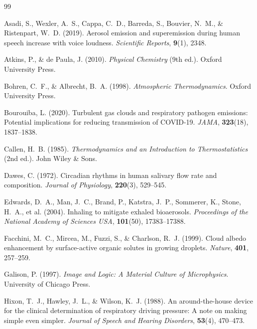\documentclass[11pt,a4paper]{article}
\theoremstyle{definition}
\theoremstyle{plain}
\begin{document}
\begin{thebibliography}{99}
\small

Asadi, S., Wexler, A.~S., Cappa, C.~D., Barreda, S., Bouvier, N.~M., \& Ristenpart, W.~D. (2019).
Aerosol emission and superemission during human speech increase with voice loudness.
\textit{Scientific Reports}, \textbf{9}(1), 2348.

Atkins, P., \& de Paula, J. (2010).
\textit{Physical Chemistry} (9th ed.).
Oxford University Press.

Bohren, C.~F., \& Albrecht, B.~A. (1998).
\textit{Atmospheric Thermodynamics}.
Oxford University Press.

Bourouiba, L. (2020).
Turbulent gas clouds and respiratory pathogen emissions: Potential implications for reducing transmission of COVID-19.
\textit{JAMA}, \textbf{323}(18), 1837--1838.

Callen, H.~B. (1985).
\textit{Thermodynamics and an Introduction to Thermostatistics} (2nd ed.).
John Wiley \& Sons.

Dawes, C. (1972).
Circadian rhythms in human salivary flow rate and composition.
\textit{Journal of Physiology}, \textbf{220}(3), 529--545.

Edwards, D.~A., Man, J.~C., Brand, P., Katstra, J.~P., Sommerer, K., Stone, H.~A., et al. (2004).
Inhaling to mitigate exhaled bioaerosols.
\textit{Proceedings of the National Academy of Sciences USA}, \textbf{101}(50), 17383--17388.

Facchini, M.~C., Mircea, M., Fuzzi, S., \& Charlson, R.~J. (1999).
Cloud albedo enhancement by surface-active organic solutes in growing droplets.
\textit{Nature}, \textbf{401}, 257--259.

Galison, P. (1997).
\textit{Image and Logic: A Material Culture of Microphysics}.
University of Chicago Press.

Hixon, T.~J., Hawley, J.~L., \& Wilson, K.~J. (1988).
An around-the-house device for the clinical determination of respiratory driving pressure: A note on making simple even simpler.
\textit{Journal of Speech and Hearing Disorders}, \textbf{53}(4), 470--473.


\end{thebibliography}
\end{document}

